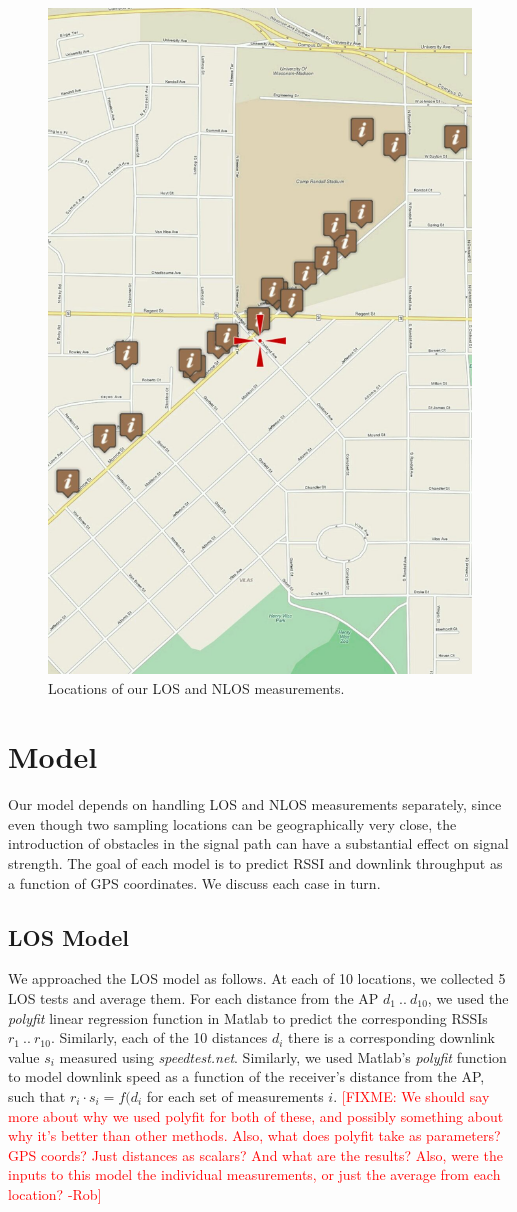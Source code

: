 \documentclass[12pt]{article}
\newcommand{\fixme}[1]{\textcolor{red}{[FIXME: #1]}}
\begin{document}
\begin{figure}[t]
\center
\includegraphics[width=.5\linewidth]{locations}
\caption{Locations of our LOS and NLOS measurements.}
\label{fig:locations}
\end{figure}

\section{Model} 
Our model depends on handling LOS and NLOS measurements separately, since even
though two sampling locations can be geographically very close, the introduction
of obstacles in the signal path can have a substantial effect on signal
strength. The goal of each model is to predict RSSI and downlink throughput as a
function of GPS coordinates. We discuss each case in turn.

\subsection{LOS Model} We approached the LOS model as follows. At each of 10
locations, we collected 5 LOS tests and average them. For each distance from the
AP $d_{1}~..~d_{10}$, we used the \textit{polyfit} linear regression function in
Matlab to predict the corresponding RSSIs $r_{1}~..~r_{10}$.
Similarly, each of the 10 distances $d_{i}$ there is a corresponding downlink
value $s_{i}$ measured using \textit{speedtest.net}.  Similarly, we used
Matlab's \textit{polyfit} function to model downlink speed as a function of
the receiver's distance from the AP, such that $r_{i} \cdot s_{i} = f(d_{i}$ for
each set of measurements $i$. 
\fixme{We should say more about why we used polyfit for both of these, and
possibly something about why it's better than other methods. Also, what does
polyfit take as parameters? GPS coords? Just distances as scalars? And what are
the results? Also, were the inputs to this model the individual measurements,
or just the average from each location? -Rob} 
\end{document}

